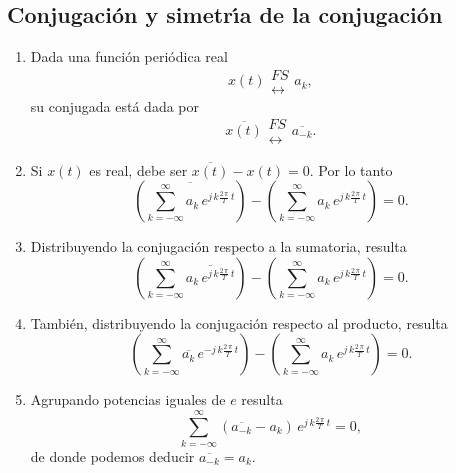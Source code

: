 \subsection{Conjugaci\'{o}n y simetr\'{\i}a de la conjugaci\'{o}n}

\begin{enumerate}
\item Dada una funci\'{o}n peri\'{o}dica real
\begin{equation}
x\left( t\right) 
\begin{array}{l}
FS \\ 
\longleftrightarrow
\end{array}
a_{k},
\end{equation}
su conjugada est\'{a} dada por
\begin{equation}
\overline{x(t)}
\begin{array}{l}
FS \\ 
\longleftrightarrow
\end{array}
\overline{a_{-k}}.
\end{equation}

\item Si $x(t)$ es real, debe ser $\overline{x(t)} - x(t) = 0$. Por lo
  tanto 
\begin{equation}
\left(\overline{\sum_{k=-\infty}^{\infty} a_{k} \, e^{j \, k \frac{2 \,
      \pi}{T} \, t}} \right) 
-
\left(\sum_{k=-\infty}^{\infty} a_{k} \, e^{j \, k \frac{2 \,
      \pi}{T} \, t} \right) = 0.
\end{equation}

\item Distribuyendo la conjugaci\'{o}n respecto a la sumatoria,
  resulta
\begin{equation}
\left( \sum_{k=-\infty}^{\infty} \overline{a_{k} \, e^{j \, k \frac{2 \,
      \pi}{T} \, t}} \right) 
-
\left(\sum_{k=-\infty}^{\infty} a_{k} \, e^{j \, k \frac{2 \,
      \pi}{T} \, t} \right) = 0.
\end{equation}

\item Tambi\'{e}n, distribuyendo la conjugaci\'{o}n respecto al producto,
  resulta
\begin{equation}
\left( \sum_{k=-\infty}^{\infty} \overline{a_{k}} \, e^{-j \, k \frac{2 \,
      \pi}{T} \, t} \right) 
-
\left(\sum_{k=-\infty}^{\infty} a_{k} \, e^{j \, k \frac{2 \,
      \pi}{T} \, t} \right) = 0.
\end{equation}

\item Agrupando potencias iguales de $e$ resulta
\begin{equation}
\sum_{k=-\infty}^{\infty} \left( \overline{a_{-k}} - a_{k} \right) \, e^{j \, k \frac{2 \,
      \pi}{T} \, t} = 0,
\end{equation}
de donde podemos deducir $\overline{a_{-k}} = a_{k}$.

\end{enumerate}

